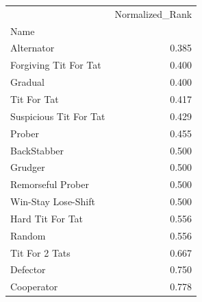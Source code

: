 \begin{tabular}{lr}
\toprule
{} &  Normalized\_Rank \\
Name                   &                  \\
\midrule
Alternator             &            0.385 \\
Forgiving Tit For Tat  &            0.400 \\
Gradual                &            0.400 \\
Tit For Tat            &            0.417 \\
Suspicious Tit For Tat &            0.429 \\
Prober                 &            0.455 \\
BackStabber            &            0.500 \\
Grudger                &            0.500 \\
Remorseful Prober      &            0.500 \\
Win-Stay Lose-Shift    &            0.500 \\
Hard Tit For Tat       &            0.556 \\
Random                 &            0.556 \\
Tit For 2 Tats         &            0.667 \\
Defector               &            0.750 \\
Cooperator             &            0.778 \\
\bottomrule
\end{tabular}
